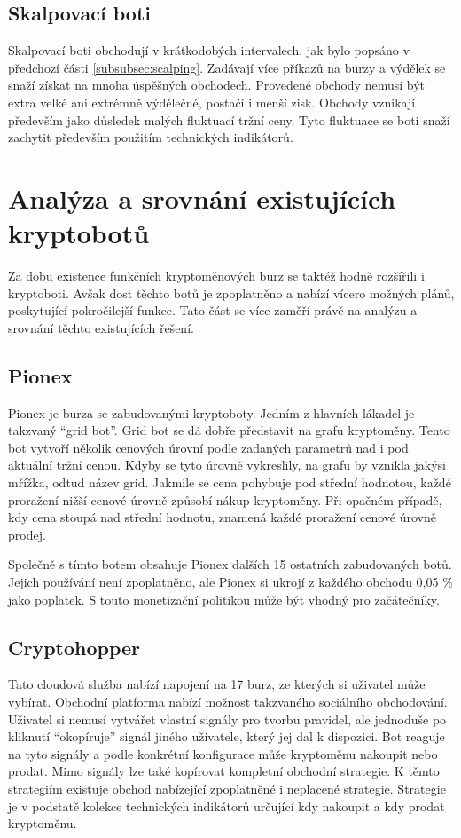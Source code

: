 \subsection{Skalpovací boti}
Skalpovací boti obchodují v krátkodobých intervalech, jak bylo popsáno v předchozí části \ref{subsubsec:scalping}. Zadávají více příkazů na burzy a výdělek se snaží
získat na mnoha úspěšných obchodech. Provedené obchody nemusí být extra velké ani extrémně výdělečné, postačí i menší zisk. Obchody vznikají především jako důsledek
malých fluktuací tržní ceny. Tyto fluktuace se boti snaží zachytit především použitím technických indikátorů.


\section{Analýza a srovnání existujících kryptobotů}
Za dobu existence funkčních kryptoměnových burz se taktéž hodně rozšířili i kryptoboti. Avšak dost těchto botů je zpoplatněno a nabízí vícero možných plánů, poskytující
pokročilejší funkce. Tato část se více zaměří právě na analýzu a srovnání těchto existujících řešení.

\subsection{Pionex}
Pionex je burza se zabudovanými kryptoboty. Jedním z hlavních lákadel je takzvaný \enquote{grid bot}. Grid bot se dá dobře představit na grafu kryptoměny. Tento bot
vytvoří několik cenových úrovní podle zadaných parametrů nad i pod aktuální tržní cenou. Kdyby se tyto úrovně vykreslily, na grafu by vznikla jakýsi mřížka, odtud název
grid. Jakmile se cena pohybuje pod střední hodnotou, každé proražení nižší cenové úrovně způsobí nákup kryptoměny. Při opačném případě, kdy cena stoupá nad střední hodnotu,
znamená každé proražení cenové úrovně prodej.

Společně s tímto botem obsahuje Pionex dalších 15 ostatních zabudovaných botů. Jejich používání není zpoplatněno, ale Pionex si ukrojí z každého obchodu 0,05 \% jako poplatek.
S touto monetizační politikou může být vhodný pro začátečníky.

\subsection{Cryptohopper}
Tato cloudová služba nabízí napojení na 17 burz, ze kterých si uživatel může vybírat. Obchodní platforma nabízí možnost takzvaného sociálního obchodování. Uživatel si
nemusí vytvářet vlastní signály pro tvorbu pravidel, ale jednoduše po kliknutí \enquote{okopíruje} signál jiného uživatele, který jej dal k dispozici. Bot reaguje na tyto
signály a podle konkrétní konfigurace může kryptoměnu nakoupit nebo prodat. Mimo signály lze také kopírovat kompletní obchodní strategie. K těmto strategiím existuje
obchod nabízející zpoplatněné i neplacené strategie. Strategie je v podstatě kolekce technických indikátorů určující kdy nakoupit a kdy prodat kryptoměnu.

